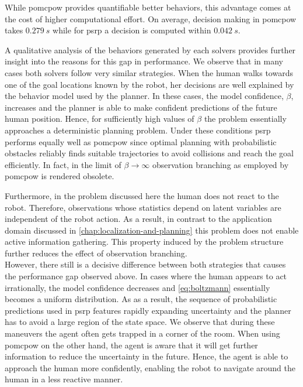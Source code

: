 While \ac{pomcpow} provides quantifiable better behaviors, this advantage comes
at the cost of higher computational effort. On average, decision making in
\ac{pomcpow} takes $\SI{0.279}{s}$ while for \ac{psrp} a decision is computed
within $\SI{0.042}{s}$.

A qualitative analysis of the behaviors generated by each solvers provides
further insight into the reasons for this gap in performance. We observe that
in many cases both solvers follow very similar strategies. When the human walks
towards one of the goal locations known by the robot, her decisions are well
explained by the behavior model used by the planner. In these cases, the model
confidence, $\beta$, increases and the planner is able to make confident
predictions of the future human position. Hence, for sufficiently high values
of $\beta$ the problem essentially approaches a deterministic planning problem.
Under these conditions \ac{psrp} performs equally well as \ac{pomcpow} since
optimal planning with probabilistic obstacles reliably finds suitable
trajectories to avoid collisions and reach the goal efficiently. In fact, in
the limit of $\beta \to \infty$ observation branching as employed by
\ac{pomcpow} is rendered obsolete.

Furthermore, in the problem discussed here the human does not react to the
robot. Therefore, observations whose statistics depend on latent variables are
independent of the robot action. As a result, in contrast to the application
domain discussed in \cref{chap:localization-and-planning} this problem does not
enable active information gathering. This property induced by the problem
structure further reduces the effect of observation branching.\\ However, there
still is a decisive difference between both strategies that causes the
performance gap observed above. In cases where the human appears to act
irrationally, the model confidence decreases and \cref{eq:boltzmann} essentially
becomes a uniform distribution. As as a result, the sequence of probabilistic
predictions used in \ac{psrp} features rapidly expanding uncertainty and the
planner has to avoid a large region of the state space. We observe that during
these maneuvers the agent often gets trapped in a corner of the room. When
using \ac{pomcpow} on the other hand, the agent is aware that it will get
further information to reduce the uncertainty in the future. Hence, the agent
is able to approach the human more confidently, enabling the robot to navigate
around the human in a less reactive manner.

